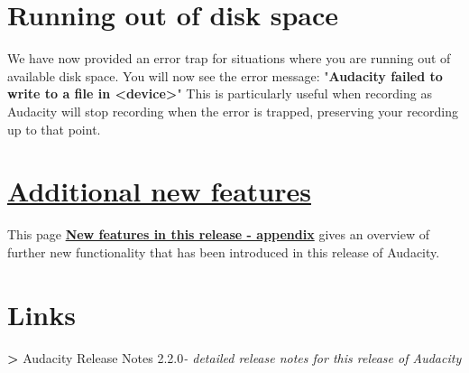 \begin{multicols}{2}
\section{Running out of disk space}We have now provided an error trap for situations where you are running out of available disk space.
You will now see the error message:
"\textbf{Audacity failed to write to a file in <device>}"
This is particularly useful when recording as Audacity will stop recording when the error is trapped, preserving your recording up to that point.

\label{new_features_in_this_release_appendix}
\section{
\hyperref[\foo{new_features_in_this_release_appendix_}]{Additional new features}
}This page \textbf{
\hyperref[\foo{new_features_in_this_release_appendix_}]{New features in this release - appendix}
} gives an overview of further new functionality that has been introduced in this release of Audacity.

\section{Links}\textbf{>} Audacity Release Notes 2.2.0\textit{- detailed release notes for this release of Audacity}\end{multicols}